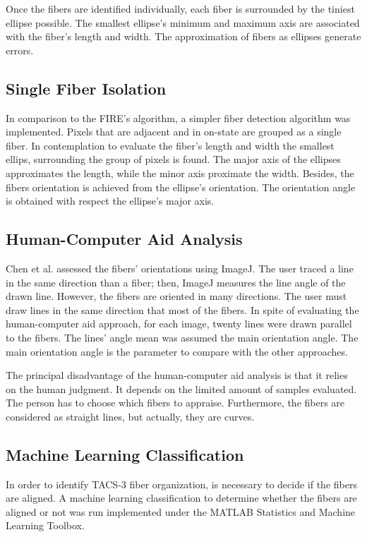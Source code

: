 \documentclass[12pt,a4paper]{article}
\begin{document}
Once the fibers are identified individually, each fiber is surrounded by the tiniest ellipse possible. The smallest ellipse's minimum and maximum axis are associated with the fiber's length and width. The approximation of fibers as ellipses generate errors. 

\subsection{Single Fiber Isolation}

In comparison to the FIRE’s algorithm, a simpler fiber detection algorithm was implemented. Pixels that are adjacent and in on-state are grouped as a single fiber. In contemplation to evaluate the fiber’s length and width the smallest ellips, surrounding the group of pixels is found. The major axis of the ellipses approximates the length, while the minor axis proximate the width. Besides, the fibers orientation is achieved from the ellipse's orientation. The orientation angle is obtained with respect the ellipse’s major axis.
\subsection{Human-Computer Aid Analysis}

Chen et al. assessed the fibers' orientations using ImageJ. The user traced a line in the same direction than a fiber; then, ImageJ measures the line angle of the drawn line. However, the fibers are oriented in many directions. The user must draw lines in the same direction that most of the fibers. In spite of evaluating the human-computer aid approach, for each image, twenty lines were drawn parallel to the fibers. The lines' angle mean was assumed the main orientation angle. The main orientation angle is the parameter to compare with the other approaches.

The principal disadvantage of the human-computer aid analysis is that it relies on the human judgment. It depends on the limited amount of samples evaluated. The person has to choose which fibers to appraise. Furthermore, the fibers are considered as straight lines, but actually, they are curves.

\subsection{Machine Learning Classification}

In order to identify TACS-3 fiber organization, is necessary to decide if the fibers are aligned. A machine learning classification to determine whether the fibers are aligned or not was run implemented under the MATLAB  Statistics and Machine Learning Toolbox.
\end{document}
